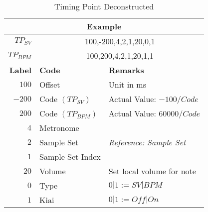 \documentclass{article}
\begin{document}
\begin{table}[ht]
	\begin{center}
    \caption{Timing Point Deconstructed}
    \label{tab:tbl_tp_dec}
    \begin{tabular}{r	|l|l}
		\multicolumn{3}{c}{\textbf{Example}} \\
		\hline
		\textbf{$TP_{SV}$}  & \multicolumn{2}{c}{100,-200,4,2,1,20,0,1} \\
		\textbf{$TP_{BPM}$} & \multicolumn{2}{c}{100,200,4,2,1,20,1,1} \\
		\hline
		\textbf{Label} & \textbf{Code} & \textbf{Remarks}\\
		\hline
		$ 100 $  & Offset              & Unit in ms\\
		$ -200 $ & Code $ (TP_{SV}) $  & Actual Value: $-100 / Code$\\
		$ 200 $  & Code $ (TP_{BPM}) $ & Actual Value: $60000 / Code$\\
		$ 4 $    & Metronome           & {}\\
		$ 2 $    & Sample Set          & \textit{Reference: Sample Set}\\
		$ 1 $    & Sample Set Index    & {}\\
		$ 20 $   & Volume              & Set local volume for note\\
		$ 0 $    & Type                & $0|1 := SV|BPM$ \\	
		$ 1 $    & Kiai                & $0|1 := Off|On$\\		
	\end{tabular}
	\end{center}
\end{table}
\end{document}
